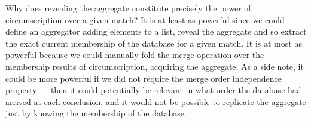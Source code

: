 Why does revealing the aggregate constitute precisely the power of circumscription over a given match?
It is at least as powerful since we could define an aggregator adding elements to a list, reveal the aggregate and so extract the exact current membership of the database for a given match.
It is at most as powerful because we could manually fold the merge operation over the membership results of circumscription, acquiring the aggregate.
As a side note, it could be more powerful if we did not require the merge order independence property --- then it could potentially be relevant in what order the database had arrived at each conclusion, and it would not be possible to replicate the aggregate just by knowing the membership of the database.


